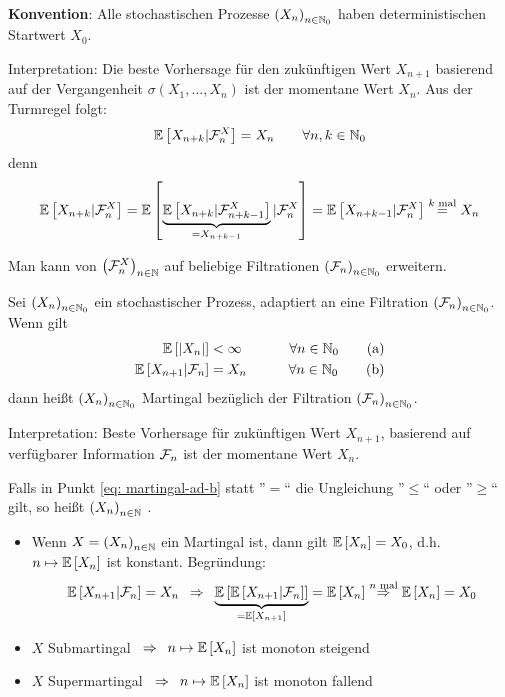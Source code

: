 \textbf{Konvention}: Alle stochastischen Prozesse $\left( X_n \right)_{n \in \mathbb{N}_0}$ haben deterministischen Startwert $X_0$.

Interpretation: Die beste Vorhersage für den zukünftigen Wert $X_{n+1}$ basierend auf der Vergangenheit $\sigma(X_1,\dots,X_n)$ ist der momentane Wert $X_n$.
Aus der Turmregel folgt:
\begin{equation*}
	\EW[X_{n+k}|\F_n^X] = X_n \qquad \forall n,k \in \N_0 %
\end{equation*}
denn
\begin{equation*}
	\mathbb{E} \left[ X_{n+k}|\mathcal{F}_n^X \right] = \mathbb{E} \left[ \underbrace{\mathbb{E} \left[ X_{n+k}|\mathcal{F}_{n+k-1}^X \right]}_{=X_{n+k-1}}|\mathcal{F}_n^X \right] = \mathbb{E} \left[ X_{n+k-1}|\mathcal{F}_n^X \right] \overset{k \text{ mal}}{=} X_n
\end{equation*}

Man kann von $\left( \mathcal{F}_n^X \right)_{n \in \mathbb{N}}$ auf beliebige Filtrationen $\left( \mathcal{F}_n \right)_{n \in \mathbb{N}_0}$ erweitern.

\begin{*definition}
	Sei $\left( X_n \right)_{n \in \mathbb{N}_0}$ ein stochastischer Prozess, adaptiert an eine Filtration $\left( \mathcal{F}_n \right)_{n \in \mathbb{N}_0}$. Wenn gilt
	\begin{alignat}{2}
		\mathbb{E} \left[ \left| X_n \right| \right] &< \infty \qquad &\forall n \in \mathbb{N}_0 \tag{a} \label{eq: martingal-ad-a}\\
		\mathbb{E} \left[ X_{n+1}|\mathcal{F}_n \right] &= X_n \qquad &\forall n \in \mathbb{N}_0  \tag{b} \label{eq: martingal-ad-b}
	\end{alignat}
	dann heißt $\left( X_n \right)_{n \in \mathbb{N}_0}$ Martingal bezüglich der Filtration $\left( \mathcal{F}_n \right)_{n \in \mathbb{N}_0}$.
\end{*definition}

Interpretation: Beste Vorhersage für zukünftigen Wert $X_{n+1}$, basierend auf verfügbarer Information $\mathcal{F}_n$ ist der momentane Wert $X_n$.

\begin{*definition}
	Falls in Punkt \eqref{eq: martingal-ad-b} statt ''$=$`` die Ungleichung ''$\le$`` oder ''$\ge$`` gilt, so heißt $\left( X_n \right)_{n \in \mathbb{N}}$ .
\end{*definition}

\begin{itemize}
	\item Wenn $X=\left( X_n \right)_{n \in \mathbb{N}}$ ein Martingal ist, dann gilt $\mathbb{E} \left[ X_n \right] = X_0$, d.h. $n \mapsto \mathbb{E} \left[ X_n \right]$ ist konstant. Begründung:
	\begin{equation*}
		\mathbb{E} \left[ X_{n+1}|\mathcal{F}_n \right] = X_n \enskip \Rightarrow \enskip \underbrace{\mathbb{E} \left[ {\mathbb{E} \left[ X_{n+1}|\mathcal{F}_n \right]} \right]}_{= \mathbb{E} \left[ X_{n+1} \right]} = \mathbb{E} \left[ X_n \right] \overset{n \text{ mal}}{\enskip \Rightarrow \enskip} \mathbb{E} \left[ X_n \right] = X_0
	\end{equation*}
	\item $X$ Submartingal $\enskip \Rightarrow \enskip n \mapsto \mathbb{E} \left[ X_n \right]$ ist monoton steigend
	\item $X$ Supermartingal $\enskip \Rightarrow \enskip n \mapsto \mathbb{E} \left[ X_n \right]$ ist monoton fallend
\end{itemize}

